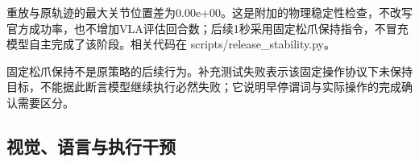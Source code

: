 重放与原轨迹的最大关节位置差为0.00e+00。这是附加的物理稳定性检查，不改写官方成功率，也不增加VLA评估回合数；后续1秒采用固定松爪保持指令，不冒充模型自主完成了该阶段。相关代码在 scripts/release\_stability.py。


固定松爪保持不是原策略的后续行为。补充测试失败表示该固定操作协议下未保持目标，不能据此断言模型继续执行必然失败；它说明早停谓词与实际操作的完成确认需要区分。

\subsection{视觉、语言与执行干预}\label{s08-detail-6}


